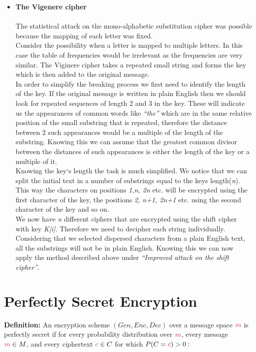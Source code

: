 \begin{itemize}
    \item \textbf{The Vigenere cipher}\\\\
The statistical attack on the mono-alphabetic substitution cipher was possible because the
mapping of each letter was fixed.\\
Consider the possibility when a letter is mapped to multiple letters. In this case the table of
frequencies would be irrelevant as the frequencies are very similar.
The Viginere cipher takes a repeated small string and forms the key which is then added to the
original message.\\
In order to simplify the breaking process we first need to identify the length of the key. If the
original message is written in plain English then we should look for repeated sequences of length
2 and 3 in the key. These will indicate us the appearances of common words like \textit{``the''} which
are in the same relative position of the small substring that is repeated, therefore the distance
between 2 such appearances would be a multiple of the length of the substring. Knowing this
we can assume that the greatest common divisor between the distances of such appearances is
either the length of the key or a multiple of it.\\
Knowing the key`s length the task is much simplified. We notice that we can split the initial text
in a number of substrings equal to the keys length(\textit{n}). This way the characters on positions \textit{1,n, 2n} etc. will be encrypted using the first character of the key, the positions \textit{2, n+1, 2n+1} etc. using the second character of the key and so on.\\
We now have \textit{n} different ciphers that are encrypted using the shift cipher with key \textit{K[i]}.
Therefore we need to decipher each string individually. Considering that we selected dispersed
characters from a plain English text, all the substrings will not be in plain English. Knowing this
we can now apply the method described above under \textit{``Improved attack on the shift cipher''}.
\end{itemize}


\section{Perfectly Secret Encryption}
\textbf{Definition:} An encryption scheme $(Gen,Enc,Dec)$ over a message space $\cm$ is perfectly secret if for every probability distribution over $\cm$, every message $\cm \in M$, and every ciphertext $\cc \in C$ for which $P(C=\cc)>0:$

